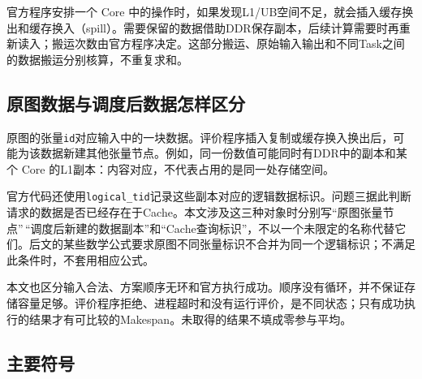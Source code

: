 \documentclass[anonymous,notoc]{gmcm2026}
\begin{document}
官方程序安排一个 Core 中的操作时，如果发现L1/UB空间不足，就会插入缓存换出和缓存换入（spill）。需要保留的数据借助DDR保存副本，后续计算需要时再重新读入；搬运次数由官方程序决定。这部分搬运、原始输入输出和不同Task之间的数据搬运分别核算，不重复求和。

\subsection{原图数据与调度后数据怎样区分}

原图的张量\texttt{id}对应输入中的一块数据。评价程序插入复制或缓存换入换出后，可能为该数据新建其他张量节点。例如，同一份数值可能同时有DDR中的副本和某个 Core 的L1副本：内容对应，不代表占用的是同一处存储空间。

官方代码还使用\texttt{logical\_tid}记录这些副本对应的逻辑数据标识。问题三据此判断请求的数据是否已经存在于Cache。本文涉及这三种对象时分别写``原图张量节点''\,``调度后新建的数据副本''和``Cache查询标识''，不以一个未限定的名称代替它们。后文的某些数学公式要求原图不同张量标识不合并为同一个逻辑标识；不满足此条件时，不套用相应公式。

本文也区分输入合法、方案顺序无环和官方执行成功。顺序没有循环，并不保证存储容量足够。评价程序拒绝、进程超时和没有运行评价，是不同状态；只有成功执行的结果才有可比较的Makespan。未取得的结果不填成零参与平均。

\subsection{主要符号}
\end{document}
